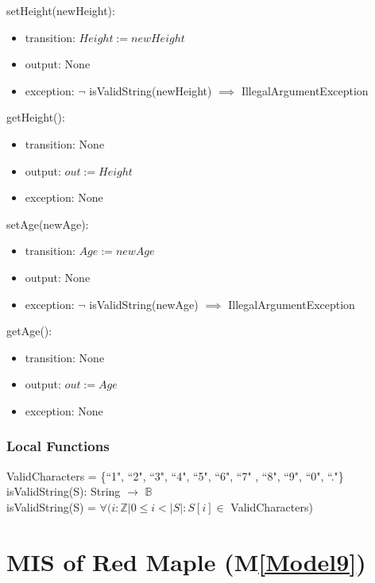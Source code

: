 \documentclass[12pt, titlepage]{article}
\newcommand{\mref}[1]{M\ref{#1}}
\begin{document}
\noindent setHeight(newHeight):
\begin{itemize}
\item transition: $\mathit{Height := newHeight}$
\item output: None
\item exception: $\neg$ isValidString(newHeight) $\implies$
IllegalArgumentException
\end{itemize}

\noindent getHeight():
\begin{itemize}
\item transition: None
\item output: $\mathit{out := Height}$
\item exception: None
\end{itemize}

\noindent setAge(newAge):
\begin{itemize}
\item transition: $\mathit{Age := newAge}$
\item output: None
\item exception: $\neg$ isValidString(newAge) $\implies$
IllegalArgumentException
\end{itemize}

\noindent getAge():
\begin{itemize}
\item transition: None
\item output: $\mathit{out := Age}$
\item exception: None
\end{itemize}

\subsubsection{Local Functions}
ValidCharacters = \{``1", ``2", ``3", ``4", ``5", ``6", ``7"
, ``8", ``9", ``0", ``."\}\\

\noindent isValidString(S): String $\rightarrow$ $\mathbb{B}$ \\

\noindent isValidString(S) = $\forall(i : \mathbb{Z} | 0 \leq
i < |S| : S[i] \in $ ValidCharacters)

 \newpage

\renewcommand{\tn}{Red Maple }
\renewcommand{\tmn}{RedMaple}
\renewcommand{\constn}{Red\ Maple}

\section{MIS of \tn (\mref{Model9})}
\end{document}
